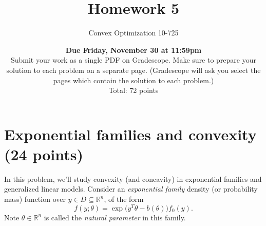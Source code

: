 \documentclass{article}
\theoremstyle{remark}
\theoremstyle{definition}
\def\R{\mathbb{R}}
\begin{document}
\title{Homework 5}
\author{\Large Convex Optimization 10-725}
\date{{\bf Due Friday, November 30 at 11:59pm} \\
\bigskip
Submit your work as a single PDF on Gradescope. Make sure to prepare your
solution to each problem on a separate page. (Gradescope will ask you select 
the pages which contain the solution to each problem.) \\
\bigskip 
Total: 72 points\\
}
\maketitle

\section{Exponential families and convexity (24 points)}

In this problem, we'll study convexity (and concavity) in exponential families
and generalized linear models. Consider an {\it exponential family} density (or
probability mass) function over $y \in D \subseteq \R^n$, of the form 
\begin{equation}
\label{eq:expfam} 
f(y; \theta) = \exp \big(y^T\theta - b(\theta) \big) f_0(y).
\end{equation}
Note $\theta \in \R^n$ is called the {\it natural parameter} in this family.
\end{document}
